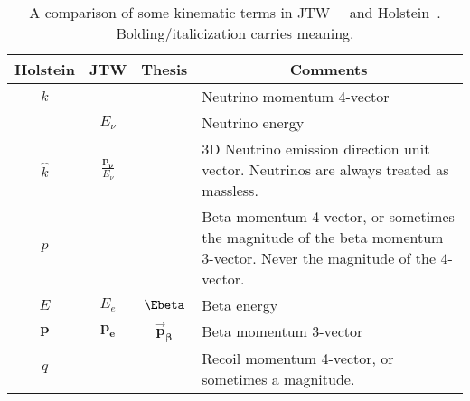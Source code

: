 %
%
%
\renewcommand{\arraystretch}{1.6}
\begin{table}[h!!!!t]
	\begin{center}
	\begin{tabular}{ | c | c | c | p{3.35in} | }
		\multicolumn{1}{c}{Holstein} 				& \multicolumn{1}{c}{JTW} 								& \multicolumn{1}{c}{Thesis} 	& \multicolumn{1}{c}{Comments}
		\\  \hline
		$k$											& 														& 								& Neutrino momentum 4-vector%
		\\  \hline
		$ $											& $E_\nu$												& 								& Neutrino energy
		\\  \hline
		$\hat{k}$ 									& $\displaystyle \frac{\mathbf{p_{\bm{\nu}}}}{E_\nu} $	&  %
																																			& 3D Neutrino emission direction unit vector.  Neutrinos are always treated as massless.
		\\  \hline
		$p$											& 														& 								& Beta momentum 4-vector, or sometimes the magnitude of the beta momentum 3-vector.  Never the magnitude of the 4-vector.
		\\  \hline
		$E$											& $E_e$													& $\Ebeta$						& Beta energy
		\\  \hline
		$ \mathbf{p} $								& $\mathbf{p_e}$										& $\bm{\vec{p}_\beta}$			& Beta momentum 3-vector
		\\  \hline
		$q$											&  														&								& Recoil momentum 4-vector, or sometimes a magnitude.
		\\  \hline
	\end{tabular}
	\end{center}
	\caption[Kinematic Terms Guide]{A comparison of some kinematic terms in JTW~\cite{jtw}~\cite{jtw_coulomb} and Holstein~\cite{holstein}\cite{holstein_errata}.  Bolding/italicization carries meaning.  }
	\label{table:compare_notation_kinematic}
\end{table}
\renewcommand{\arraystretch}{1}
%
%